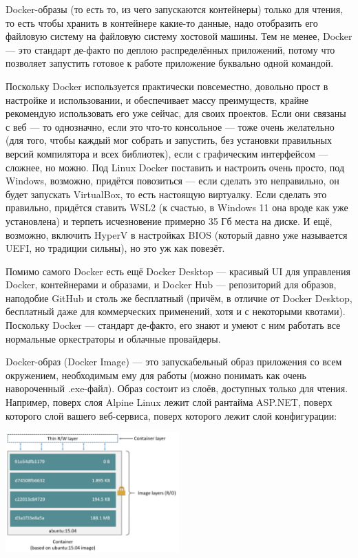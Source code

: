 \documentclass{../text-style}
\begin{document}
Docker-образы (то есть то, из чего запускаются контейнеры) только для чтения, то есть чтобы хранить в контейнере какие-то данные, надо отобразить его файловую систему на файловую систему хостовой машины. Тем не менее, Docker --- это стандарт де-факто по деплою распределённых приложений, потому что позволяет запустить готовое к работе приложение буквально одной командой. 

Поскольку Docker используется практически повсеместно, довольно прост в настройке и использовании, и обеспечивает массу преимуществ, крайне рекомендую использовать его уже сейчас, для своих проектов. Если они связаны с веб --- то однозначно, если это что-то консольное --- тоже очень желательно (для того, чтобы каждый мог собрать и запустить, без установки правильных версий компилятора и всех библиотек), если с графическим интерфейсом --- сложнее, но можно. Под Linux Docker поставить и настроить очень просто, под Windows, возможно, придётся повозиться --- если сделать это неправильно, он будет запускать VirtualBox, то есть настоящую виртуалку. Если сделать это правильно, придётся ставить WSL2 (к счастью, в Windows 11 она вроде как уже установлена) и терпеть исчезновение примерно 35 Гб места на диске. И ещё, возможно, включить HyperV в настройках BIOS (который давно уже называется UEFI, но традиции сильны), но это уж как повезёт.

Помимо самого Docker есть ещё Docker Desktop --- красивый UI для управления Docker, контейнерами и образами, и Docker Hub --- репозиторий для образов, наподобие GitHub и столь же бесплатный (причём, в отличие от Docker Desktop, бесплатный даже для коммерческих применений, хотя и с некоторыми квотами). Поскольку Docker --- стандарт де-факто, его знают и умеют с ним работать все нормальные оркестраторы и облачные провайдеры.

Docker-образ (Docker Image) --- это запускабельный образ приложения со всем окружением, необходимым ему для работы (можно понимать как очень навороченный .exe-файл). Образ состоит из слоёв, доступных только для чтения. Например, поверх слоя Alpine Linux лежит слой рантайма ASP.NET, поверх которого слой вашего веб-сервиса, поверх которого лежит слой конфигурации:

\begin{center}
    \includegraphics[width=0.5\textwidth]{dockerLayers.png}
\end{center}
\end{document}
